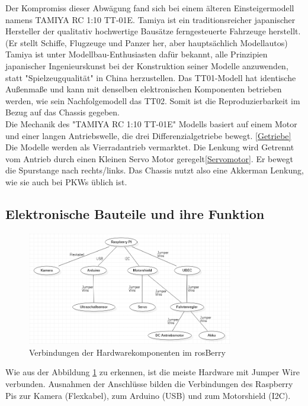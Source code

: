 \documentclass[conference]{IEEEtran}
\begin{document}
Der Kompromiss dieser Abwägung fand sich bei einem älteren Einsteigermodell namens TAMIYA RC 1:10 TT-01E. Tamiya ist ein traditionsreicher japanischer Hersteller der qualitativ hochwertige Bausätze ferngesteuerte Fahrzeuge herstellt. (Er stellt Schiffe, Flugzeuge und Panzer her, aber hauptsächlich Modellautos) Tamiya ist unter Modellbau-Enthusiasten dafür bekannt, alle Prinzipien japanischer Ingenieurskunst bei der Konstruktion seiner Modelle anzuwenden, statt "Spielzeugqualität" in China herzustellen. Das TT01-Modell hat identische Außenmaße und kann mit denselben elektronischen Komponenten betrieben werden, wie sein Nachfolgemodell das TT02. Somit ist die Reproduzierbarkeit im Bezug auf das Chassis gegeben.
\\
Die Mechanik des "TAMIYA RC 1:10 TT-01E" Modells basiert auf einem Motor und einer langen Antriebswelle, die drei Differenzialgetriebe bewegt. \ref{Getriebe} Die Modelle werden als Vierradantrieb vermarktet. Die Lenkung wird Getrennt vom Antrieb durch einen Kleinen Servo Motor geregelt\ref{Servomotor}. Er bewegt die Spurstange nach rechts/links. Das Chassis nutzt also eine Akkerman Lenkung, wie sie auch bei PKWs üblich ist.

\subsection{Elektronische Bauteile und ihre Funktion}
\begin{figure} %
	\centering
	\includegraphics[width=9cm]{img/Hardwarekomponenten.PNG}
	\caption{Verbindungen der Hardwarekomponenten im rosBerry}
	\label{Hardwarekomponenten}
\end{figure}

Wie aus der Abbildung \ref{Hardwarekomponenten} zu erkennen, ist die meiste Hardware mit Jumper Wire verbunden.
Ausnahmen der Anschlüsse bilden die Verbindungen des Raspberry Pis zur Kamera (Flexkabel), zum Arduino (USB) und zum Motorshield (I2C).
\\
\end{document}
